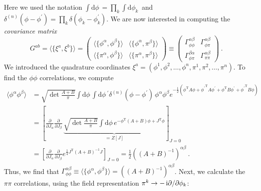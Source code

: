 \documentclass[letter]{article}
\newcommand{\intd}[1]{\int\mathrm{d}#1\,}
\begin{document}
Here we used the notation $\intd\phi = \prod_k \intd{\phi_k}$ and $\delta^{(n)}(\phi - \phi^\prime) = \prod_k \delta(\phi_k - \phi_k^\prime)$. We are now interested in computing the \emph{covariance matrix}
\begin{equation}
G^{a b} = \langle \{ \xi^a, \xi^b \} \rangle =
\begin{pmatrix}
\langle \{ \phi^\alpha, \phi^\beta \} \rangle & \langle \{ \phi^\alpha, \pi^\beta \} \rangle \\
\langle \{ \pi^\alpha, \phi^\beta \} \rangle & \langle \{ \pi^\alpha, \pi^\beta \} \rangle
\end{pmatrix}
\equiv
\begin{pmatrix}
\Gamma^{\alpha\beta}_{\phi\phi} & \Gamma^{\alpha\beta}_{\phi\pi} \\
\Gamma^{\beta\alpha}_{\phi\pi} & \Gamma^{\alpha\beta}_{\pi\pi}
\end{pmatrix}\ .
\end{equation}
We introduced the quadrature coordinates $\xi^a = (\phi^1, \phi^2,\dots,\phi^n,\pi^1,\pi^2,\dots,\pi^n)$. To find the $\phi\phi$ correlations, we compute
\begin{align}
\langle \phi^\alpha \phi^\beta \rangle &= \sqrt{\det\frac{A+B}{\pi}} \intd\phi \intd\phi^\prime  \delta^{(n)}(\phi - \phi^\prime)\, \phi^\alpha \phi^\beta e^{ -\frac{1}{2} (\phi^\mathrm{T} A \phi + {\phi^\prime}^\mathrm{T} A \phi^\prime + \phi^\mathrm{T} B \phi^\prime + {\phi^\prime}^\mathrm{T} B \phi ) } \nonumber\\
&= \left[ \frac{\partial}{\partial J_\alpha} \frac{\partial}{\partial J_\beta}\, 
\underbrace{\sqrt{\det\frac{A+B}{\pi}} \intd\phi  e^{ -\phi^\mathrm{T} (A+B) \phi + J^\mathrm{T} \phi }}_{= Z[J]} \right]_{J=0} \nonumber\\
&= \left[ \frac{\partial}{\partial J_\alpha} \frac{\partial}{\partial J_\beta} e^{\frac{1}{4} J^\mathrm{T} (A+B)^{-1} J} \right]_{J=0}  = \frac{1}{2} ((A+B)^{-1})^{\alpha\beta}\ .
\end{align}
Thus, we find that $\Gamma^{\alpha\beta}_{\phi\phi} \equiv \langle \{ \phi^\alpha, \phi^\beta \} \rangle = ((A+B)^{-1})^{\alpha\beta}$. Next, we calculate the $\pi\pi$ correlations, using the field representation $\pi^k \to - \,\mathrm{i} \partial/\partial\phi_k$:
\end{document}
